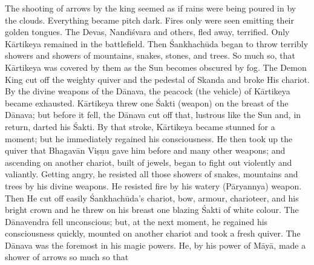 The shooting of arrows by the king seemed as if rains were being poured in by the clouds. Everything became pitch dark. Fires only were seen emitting their golden tongues. The Devas, Nand\={\i}\'svara and others, fled away, terrified. Only K\=artikeya remained in the battlefield. Then \'Sankhach\=uda began to throw terribly showers and showers of mountains, snakes, stones, and trees. So much so, that K\=artikeya was covered by them as the Sun becomes obscured by fog. The Demon King cut off the weighty quiver and the pedestal of Skanda and broke His chariot. By the divine weapons of the D\=anava, the peacock (the vehicle) of K\=artikeya became exhausted. K\=artikeya threw one \'Sakti (weapon) on the breast of the D\=anava; but before it fell, the D\=anava cut off that, lustrous like the Sun and, in return, darted his \'Sakti. By that stroke, K\=artikeya became stunned for a moment; but he immediately regained his consciousness. He then took up the quiver that Bhagav\=an Vi\d{s}\d{n}u gave him before and many other weapons; and ascending on another chariot, built of jewels, began to fight out violently and valiantly. Getting angry, he resisted all those showers of snakes, mountains and trees by his divine weapons. He resisted fire by his watery (P\=aryannya) weapon. Then He cut off easily \'Sankhach\=uda's chariot, bow, armour, charioteer, and his bright crown and he threw on his breast one blazing \'Sakti of white colour. The D\=anavendra fell unconscious; but, at the next moment, he regained his consciousness quickly, mounted on another chariot and took a fresh quiver. The D\=anava was the foremost in his magic powers. He, by his power of M\=ay\=a, made a shower of arrows so much so that

